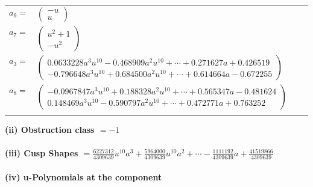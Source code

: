 \documentclass[1p]{elsarticle_modified}
\theoremstyle{definition}
\begin{document}
\begin{tabular}{m{7pt} m{180pt} m{7pt} m{180pt} }
\flushright $a_{9}=$&$\begin{pmatrix}- u\\u\end{pmatrix}$ \\
\flushright $a_{7}=$&$\begin{pmatrix}u^2+1\\- u^2\end{pmatrix}$ \\
\flushright $a_{3}=$&$\begin{pmatrix}0.0633228 a^{3} u^{10}-0.468909 a^{2} u^{10}+\cdots+0.271627 a+0.426519\\-0.796648 a^{3} u^{10}+0.684500 a^{2} u^{10}+\cdots+0.614664 a-0.672255\end{pmatrix}$ \\
\flushright $a_{8}=$&$\begin{pmatrix}-0.0967847 a^{3} u^{10}+0.188328 a^{2} u^{10}+\cdots+0.565347 a-0.481624\\0.148469 a^{3} u^{10}-0.590797 a^{2} u^{10}+\cdots+0.472771 a+0.763252\end{pmatrix}$\\&\end{tabular}
\flushleft \textbf{(ii) Obstruction class $= -1$}\\~\\
\flushleft \textbf{(iii) Cusp Shapes $= \frac{6227312}{4309639} u^{10} a^3+\frac{5964000}{4309639} u^{10} a^2+\cdots-\frac{1111192}{4309639} a+\frac{41519866}{4309639}$}\\~\\
\newpage\renewcommand{\arraystretch}{1}
\flushleft \textbf{(iv) u-Polynomials at the component}\newline \\
\end{document}
